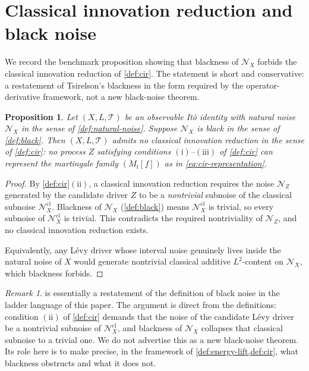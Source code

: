 \documentclass[11pt,reqno]{amsart}
\theoremstyle{plain}
\newtheorem{proposition}[theorem]{Proposition}
\theoremstyle{definition}
\theoremstyle{remark}
\newtheorem{remark}[theorem]{Remark}
\begin{document}
\section{Classical innovation reduction and black noise}\label{sec:proposition}

We record the benchmark proposition showing that blackness of
$\mathcal N_X$ forbids the classical innovation reduction of
\cref{def:cir}. The statement is short and conservative:
a restatement of Tsirelson's blackness in the form required by the
operator-derivative framework, not a new black-noise theorem.

\begin{proposition}\label{prop:no-cir}
Let $(X,L,\mathcal T)$ be an observable It\^o identity with natural
noise $\mathcal N_X$ in the sense of \cref{def:natural-noise}.
Suppose $\mathcal N_X$ is black in the sense of \cref{def:black}.
Then $(X,L,\mathcal T)$ admits no classical innovation reduction in
the sense of \cref{def:cir}: no process $Z$ satisfying conditions
$(\mathrm i)$--$(\mathrm{iii})$ of \cref{def:cir} can represent the
martingale family $(M_t[f])$ as in
\eqref{eq:cir-representation}.
\end{proposition}

\begin{proof}
By \cref{def:cir}$(\mathrm{ii})$, a classical innovation reduction
requires the noise $\mathcal N_Z$ generated by the candidate driver
$Z$ to be a \emph{nontrivial} subnoise of the classical subnoise
$\mathcal N_X^{\mathrm{cl}}$. Blackness of $\mathcal N_X$
(\cref{def:black}) means $\mathcal N_X^{\mathrm{cl}}$ is trivial, so
every subnoise of $\mathcal N_X^{\mathrm{cl}}$ is trivial. This
contradicts the required nontriviality of $\mathcal N_Z$, and no
classical innovation reduction exists.

Equivalently, any L\'evy driver whose interval noise genuinely lives
inside the natural noise of $X$ would generate nontrivial classical
additive $L^2$-content on $\mathcal N_X$, which blackness forbids.
\end{proof}

\begin{remark}\label{rem:prop-tsirelson-restatement}
 is essentially a restatement of the definition of
black noise in the ladder language of this paper. The argument is
direct from the definitions: condition $(\mathrm{ii})$ of
\cref{def:cir} demands that the noise of the candidate L\'evy driver
be a nontrivial subnoise of $\mathcal N_X^{\mathrm{cl}}$, and
blackness of $\mathcal N_X$ collapses that classical subnoise to a
trivial one. We do not advertise this as a new black-noise theorem.
Its role here is to make precise, in the framework of
\cref{def:energy-lift,def:cir}, what blackness obstructs and what it
does not.
\end{remark}
\end{document}
